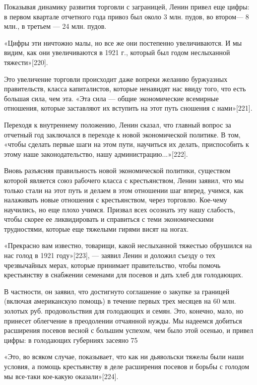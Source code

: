 \documentclass[12pt, a4paper, openany]{book}
\begin{document}
Показывая динамику развития торговли с заграницей, Ленин привел еще цифры: в первом квартале отчетного года привоз был около 3 млн. пудов, во втором— 8 млн., в третьем — 24 млн. пудов.

«Цифры эти ничтожно малы, но все же они постепенно увеличиваются. И мы видим, как они увеличиваются в 1921 г., который был годом неслыханной тяжести»[220].

Это увеличение торговли происходит даже вопреки желанию буржуазных правительств, класса капиталистов, которые ненавидят нас ввиду того, что есть большая сила, чем эта. «Эта сила — общие экономические всемирные отношения, которые заставляют их вступить на этот путь сношения с нами»[221].

Переходя к внутреннему положению, Ленин сказал, что главный вопрос за отчетный год заключался в переходе к новой экономической политике. В том, «чтобы сделать первые шаги на этом пути, научиться их делать, приспособить к этому наше законодательство, нашу администрацию...»[222].

Вновь разъясняя правильность новой экономической политики, существом которой является союз рабочего класса с крестьянством, Ленин заявил, что мы только стали на этот путь и делаем в этом отношении шаг вперед, учимся, как налаживать новые отношения с крестьянством, через торговлю. Кое-чему научились, но еще плохо учимся. Призвал всех осознать эту нашу слабость, чтобы скорее ее ликвидировать и справиться с теми экономическими трудностями, которые еще тяжелыми гирями висят на ногах.

«Прекрасно вам известно, товарищи, какой неслыханной тяжестью обрушился на нас голод в 1921 году»[223], — заявил Ленин и доложил съезду о тех чрезвычайных мерах, которые принимает правительство, чтобы помочь крестьянству в снабжении семенами для посевов и дать хлеб для голодающих.

В частности, он заявил, что достигнуто соглашение о закупке за границей (включая американскую помощь) в течение первых трех месяцев на 60 млн. золотых руб. продовольствия для голодающих и семян. Это, конечно, мало, но принесет облегчение в преодолении отчаянной нужды. Мы надеемся добиться расширения посевов весной с большим успехом, чем было этой осенью, и привел цифры: в голодающих губерниях засеяно 75 %

«Это, во всяком случае, показывает, что как ни дьявольски тяжелы были наши условия, а помощь крестьянству в деле расширения посевов и борьбы с голодом мы все-таки кое-какую оказали»[224].
\end{document}
